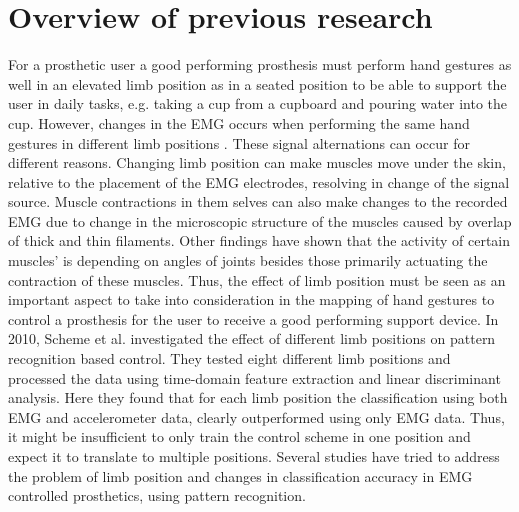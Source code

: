 \section{Overview of previous research}

For a prosthetic user a good performing prosthesis must perform hand gestures as well in an elevated limb position as in a seated position to be able to support the user in daily tasks, e.g. taking a cup from a cupboard and pouring water into the cup. However, changes in the EMG occurs when performing the same hand gestures in different limb positions \cite{Fougner2011, avella2006}. These signal alternations can occur for different reasons. Changing limb position can make muscles move under the skin, relative to the placement of the EMG electrodes, resolving in change of the signal source. Muscle contractions in them selves can also make changes to the recorded EMG due to change in the microscopic structure of the muscles caused by overlap of thick and thin filaments. \cite{martini}  
Other findings have shown that the activity of certain muscles' is depending on angles of joints besides those primarily actuating the contraction of these muscles. \cite{Fougner2011} Thus, the effect of limb position must be seen as an important aspect to take into consideration in the mapping of hand gestures to control a prosthesis for the user to receive a good performing support device. %
In 2010, Scheme et al. investigated the effect of different limb positions on pattern recognition based control. They tested eight different limb positions and processed the data using time-domain feature extraction and linear discriminant analysis. Here they found that for each limb position the classification using both EMG and accelerometer data, clearly outperformed using only EMG data. Thus, it might be insufficient to only train the control scheme in one position and expect it to translate to multiple positions. \cite{Fougner2010} 
Several studies have tried to address the problem of limb position and changes in classification accuracy in EMG controlled prosthetics, using pattern recognition. %


